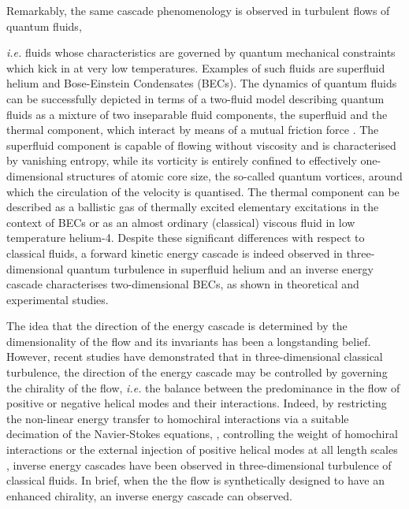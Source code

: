 \documentclass[%
 reprint,
 amsmath,amssymb,
 aps,
 prl,
]{revtex4-2}
\begin{document}
Remarkably, the same cascade phenomenology is observed in turbulent flows of quantum fluids, {\textit{i.e.} fluids whose characteristics are governed by quantum mechanical constraints which kick in at very low temperatures. Examples of such fluids are superfluid helium and Bose-Einstein Condensates (BECs). 
The dynamics of quantum fluids can be successfully depicted in terms of a two-fluid model \cite{tisza-1938,landau-1949,skrbek-sreenivasan-2012} describing quantum fluids as a mixture of two inseparable fluid components, the superfluid and the thermal component, which interact by means of a mutual friction force \cite{jackson-etal-2009,hall-vinen-1956a,hall-vinen-1956b}. The superfluid component is capable of flowing without viscosity and is characterised by vanishing entropy, while its vorticity is
entirely confined to effectively one-dimensional structures of atomic core size, the so-called quantum vortices, 
around which the circulation of the velocity is quantised.
The thermal component can be described as a ballistic gas of thermally excited elementary excitations in the context of BECs or as an almost ordinary (classical) viscous fluid 
in low temperature helium-4. Despite these significant differences with respect to classical fluids, 
a forward kinetic energy cascade is indeed observed in three-dimensional quantum turbulence in superfluid helium 
\cite{maurer1998,salort2010turbulent,baggaley2012,sherwin-robson2015} and an inverse energy cascade characterises two-dimensional BECs, as shown in theoretical \cite{bradley2012energy,reeves2013,simula2014emergence} and experimental \cite{johnstone2019evolution,gauthier2019giant} studies.

The idea that the direction of the energy cascade is determined by the dimensionality of the flow and its invariants has been a longstanding belief. However,
recent studies have demonstrated that in three-dimensional classical turbulence, 
the direction of the energy cascade may be controlled by governing the chirality of the 
flow, \textit{i.e.} the balance between the predominance in the flow of positive or negative helical modes and their interactions. 
Indeed, by restricting the non-linear energy transfer to homochiral interactions via a suitable decimation of the Navier-Stokes equations, 
\cite{biferaleInverseEnergyCascade2012a,biferale-etal-2013}, controlling the weight of homochiral interactions \cite{sahoo-etal-2017} or the external injection 
of positive helical modes at all length scales \cite{plunianInverseCascadeEnergy2020a}, inverse energy cascades have been observed in three-dimensional turbulence
of classical fluids. In brief, when the the flow is synthetically designed to have an enhanced chirality, an inverse energy cascade can observed.

}
\end{document}
